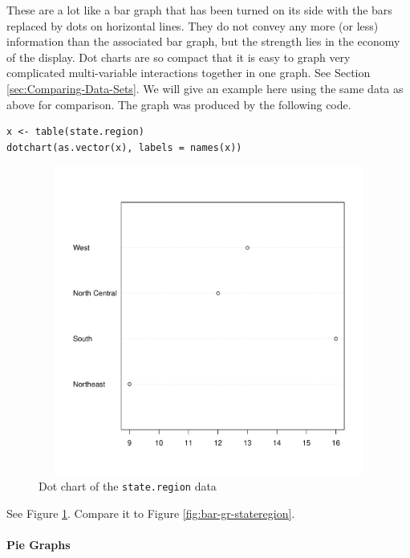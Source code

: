 \documentclass[captions=tableheading]{scrbook}
\begin{document}
These are a lot like a bar graph that has been turned on its side with the bars replaced by dots on horizontal lines. They do not convey any more (or less) information than the associated bar graph, but the strength lies in the economy of the display. Dot charts are so compact that it is easy to graph very complicated multi-variable interactions together in one graph. See Section \ref{sec:Comparing-Data-Sets}. We will give an example here using the same data as above for comparison. The graph was produced by the following code.

\begin{example}


\begin{verbatim}
x <- table(state.region)
dotchart(as.vector(x), labels = names(x))
\end{verbatim}



\begin{figure}[th]
    \includegraphics[width=5in, height=4in]{img/dot-charts.pdf}
    \caption{Dot chart of the \texttt{state.region} data}
    \label{fig:dot-charts}
  \end{figure}

See Figure \ref{fig:dot-charts}. Compare it to Figure \ref{fig:bar-gr-stateregion}.

\end{example}

\paragraph*{Pie Graphs}
\label{par:Pie-Graphs}
\end{document}
